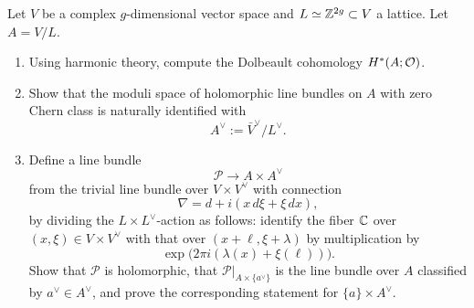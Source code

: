 \documentclass[12pt]{article}
\begin{document}
\begin{exercise}
Let $V$ be a complex $g$-dimensional vector space and
$L\simeq\mathbb{Z}^{2g}\subset V$ a lattice. Let $A = V/L$.

\begin{enumerate}
\item Using harmonic theory, compute the Dolbeault cohomology $H^\ast(A;{\mathcal{O}})$.

\item Show that the moduli space of holomorphic line bundles on $A$ with zero
Chern class is naturally identified with
\[
A^\vee := \bar{V}^\vee / L^\vee.
\]

\item Define a line bundle
\[
\mathcal{P}\longrightarrow A\times A^\vee
\]
from the trivial line bundle over $V\times V^\vee$ with connection
\[
\nabla = d + i(x\,d\xi + \xi\,dx),
\]
by dividing the $L\times L^\vee$-action as follows: identify the
fiber $\mathbb{C}$ over $(x,\xi)\in V\times V^\vee$ with that over
$(x+\ell,\xi+\lambda)$ by multiplication by
\[
\exp\bigl(2\pi i(\lambda(x)+\xi(\ell))\bigr).
\]
Show that $\mathcal{P}$ is holomorphic, that
$\mathcal{P}|_{A\times\{a^\vee\}}$ is the line bundle over $A$ classified
by $a^\vee\in A^\vee$, and prove the corresponding statement for
$\{a\}\times A^\vee$.
\end{enumerate}
\end{exercise}
\end{document}

